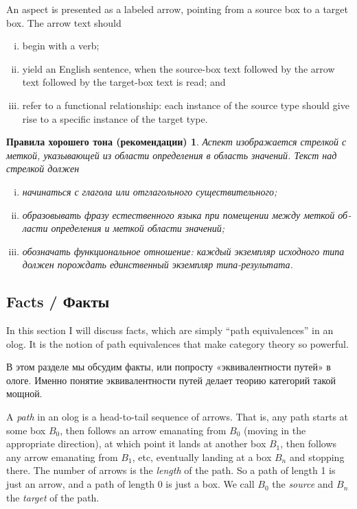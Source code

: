 \documentclass[a4paper]{book}
\theoremstyle{myth}
\newtheorem{rulesENG}[envENG]{\begin{english}Rules of good practice\end{english}}
\newtheorem{rulesRUS}[envRUS]{Правила хорошего тона (рекомендации)}
\begin{document}
\begin{russian}
\begin{rulesENG}\label{rules:aspects}
An aspect is presented as a labeled arrow, pointing from a source box to a target box.  The arrow text should
\begin{enumerate}[(i)]
\item begin with a verb;
\item yield an English sentence, when the source-box text followed by the arrow text followed by the target-box text is read; and
\item refer to a functional relationship: each instance of the source type should give rise to a specific instance of the target type.
\end{enumerate}
\end{rulesENG}

\begin{rulesRUS}\label{rules:aspects}
Аспект изображается стрелкой с меткой, указывающей из области определения в область значений.  Текст над стрелкой должен
\begin{enumerate}[(i)]
\item начинаться с глагола или отглагольного существительного;
\item образовывать фразу естественного языка при помещении между меткой области определения и меткой области значений;
\item обозначать функциональное отношение: каждый экземпляр исходного типа должен порождать единственный экземпляр типа-результата.
\end{enumerate}
\end{rulesRUS}


\subsection{Facts / Факты}\label{sec:facts}

In this section I will discuss facts, which are simply “path equivalences” in an olog. It is the notion of path equivalences that make category theory so powerful. 

В этом разделе мы обсудим факты, или попросту «эквивалентности путей» в ологе. Именно понятие эквивалентности путей делает теорию категорий такой мощной. 

A {\em path} in an olog is a head-to-tail sequence of arrows. That is, any path starts at some box $B_0$, then follows an arrow emanating from $B_0$ (moving in the appropriate direction), at which point it lands at another box $B_1$, then follows any arrow emanating from $B_1$, etc, eventually landing at a box $B_n$ and stopping there. The number of arrows is the {\em length} of the path. So a path of length 1 is just an arrow, and a path of length 0 is just a box. We call $B_0$ the {\em source} and $B_n$ the {\em target} of the path.


\end{russian}
\end{document}
